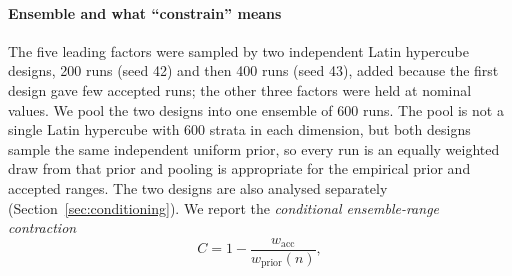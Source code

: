 \documentclass[preprint,12pt,authoryear]{elsarticle}
\begin{document}
\paragraph{Ensemble and what ``constrain'' means} The five leading factors were sampled by two independent Latin hypercube designs, 200 runs (seed 42) and then 400 runs (seed 43), added because the first design gave few accepted runs; the other three factors were held at nominal values. We pool the two designs into one ensemble of 600 runs. The pool is not a single Latin hypercube with 600 strata in each dimension, but both designs sample the same independent uniform prior, so every run is an equally weighted draw from that prior and pooling is appropriate for the empirical prior and accepted ranges. The two designs are also analysed separately (Section~\ref{sec:conditioning}). We report the \emph{conditional ensemble-range contraction}
\begin{equation}
C = 1 - \frac{w_\mathrm{acc}}{w_\mathrm{prior}(n)},
\label{eq:contraction}
\end{equation}
\end{document}
